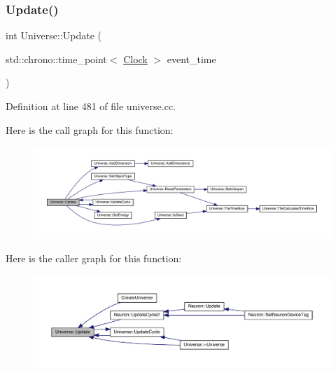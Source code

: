 \subsubsection{\texorpdfstring{Update()}{Update()}}
{\footnotesize\ttfamily int Universe\+::\+Update (\begin{DoxyParamCaption}\item[{std\+::chrono\+::time\+\_\+point$<$ \hyperlink{universe_8h_a0ef8d951d1ca5ab3cfaf7ab4c7a6fd80}{Clock} $>$}]{event\+\_\+time }\end{DoxyParamCaption})}



Definition at line 481 of file universe.\+cc.

Here is the call graph for this function\+:
\nopagebreak
\begin{figure}[H]
\begin{center}
\leavevmode
\includegraphics[width=350pt]{class_universe_a64ee5a2c7e86c56fa426acb750438ce9_cgraph}
\end{center}
\end{figure}
Here is the caller graph for this function\+:
\nopagebreak
\begin{figure}[H]
\begin{center}
\leavevmode
\includegraphics[width=350pt]{class_universe_a64ee5a2c7e86c56fa426acb750438ce9_icgraph}
\end{center}
\end{figure}
\mbox{\label{class_universe_a0d79e614e1af951c06b78cb5768f9c8e}} 
